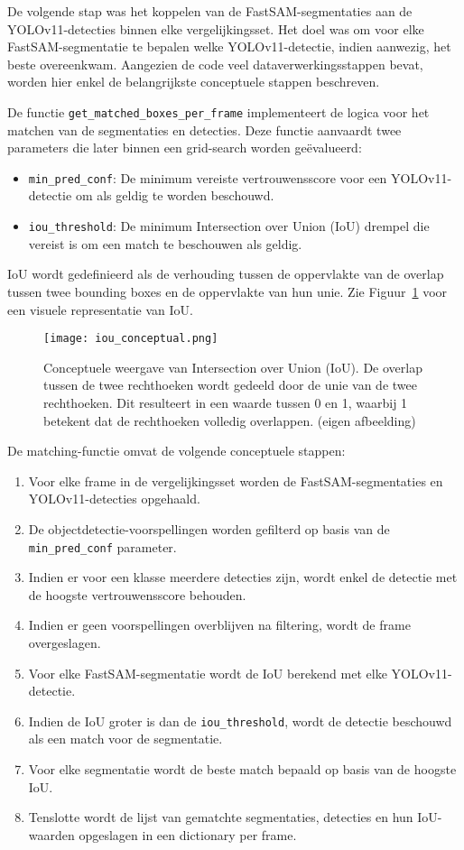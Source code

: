 De volgende stap was het koppelen van de FastSAM-segmentaties aan de YOLOv11-detecties binnen elke vergelijkingsset.
Het doel was om voor elke FastSAM-segmentatie te bepalen welke YOLOv11-detectie, indien aanwezig, het beste overeenkwam.
Aangezien de code veel dataverwerkingsstappen bevat, worden hier enkel de belangrijkste conceptuele stappen beschreven.

De functie \texttt{get\_matched\_boxes\_per\_frame} implementeert de logica voor het matchen van de segmentaties en detecties.
Deze functie aanvaardt twee parameters die later binnen een grid-search worden geëvalueerd:
\begin{itemize}
  \item \texttt{min\_pred\_conf}: De minimum vereiste vertrouwensscore voor een YOLOv11-detectie om als geldig te worden beschouwd.
  \item \texttt{iou\_threshold}: De minimum Intersection over Union (IoU) drempel die vereist is om een match te beschouwen als geldig.  
\end{itemize}
IoU wordt gedefinieerd als de verhouding tussen de oppervlakte van de overlap tussen twee bounding boxes en de oppervlakte van hun unie.
Zie Figuur~\ref{fig:iou-conceptual} voor een visuele representatie van IoU.

\begin{figure}[H]
    \centering
    \texttt{[image: iou\_conceptual.png]}
    \caption[Conceptuele weergave van Intersection over Union (IoU)]{
        \label{fig:iou-conceptual}
        Conceptuele weergave van Intersection over Union (IoU).
        De overlap tussen de twee rechthoeken wordt gedeeld door de unie van de twee rechthoeken.
        Dit resulteert in een waarde tussen 0 en 1, waarbij 1 betekent dat de rechthoeken volledig overlappen.
        (eigen afbeelding)
      }
\end{figure}

De matching-functie omvat de volgende conceptuele stappen:
\begin{enumerate}
    \item Voor elke frame in de vergelijkingsset worden de FastSAM-segmentaties en YOLOv11-detecties opgehaald.
    \item De objectdetectie-voorspellingen worden gefilterd op basis van de \texttt{min\_pred\_conf} parameter.
    \item Indien er voor een klasse meerdere detecties zijn, wordt enkel de detectie met de hoogste vertrouwensscore behouden.
    \item Indien er geen voorspellingen overblijven na filtering, wordt de frame overgeslagen.
    \item Voor elke FastSAM-segmentatie wordt de IoU berekend met elke YOLOv11-detectie.
    \item Indien de IoU groter is dan de \texttt{iou\_threshold}, wordt de detectie beschouwd als een match voor de segmentatie.
    \item Voor elke segmentatie wordt de beste match bepaald op basis van de hoogste IoU.
    \item Tenslotte wordt de lijst van gematchte segmentaties, detecties en hun IoU-waarden opgeslagen in een dictionary per frame.
\end{enumerate}

